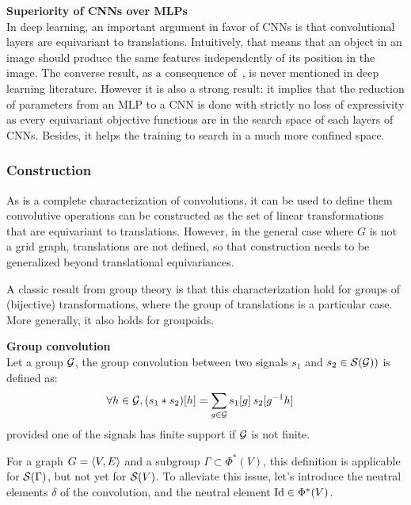 \begin{remark}\textbf{Superiority of CNNs over MLPs}\\
In deep learning, an important argument in favor of CNNs is that convolutional layers are equivariant to translations. Intuitively, that means that an object in an image should produce the same features independently of its position in the image. The converse result, as a consequence of~, is never mentioned in deep learning literature. However it is also a strong result: it implies that the reduction of parameters from an MLP to a CNN is done with strictly no loss of expressivity as every equivariant objective functions are in the search space of each layers of CNNs. Besides, it helps the training to search in a much more confined space.
\end{remark}

\subsubsection{Construction}

As  is a complete characterization of convolutions, it can be used to define them \ie convolutive operations can be constructed as the set of linear transformations that are equivariant to translations. However, in the general case where $G$ is not a grid graph, translations are not defined, so that construction needs to be generalized beyond translational equivariances.

A classic result from group theory is that this characterization hold for groups of (bijective) transformations, where the group of translations is a particular case. More generally, it also holds for groupoids.

\begin{definition}\textbf{Group convolution}\\
Let a group $\mathcal{G}$, the group convolution between two signals $s_1$ and $s_2 \in \mathcal{S}(\mathcal{G}))$ is defined as:
\begin{align*}
\forall h \in \group, (s_1 \ast s_2)[h] & = \displaystyle \sum_{g \in \group} s_1[g] \h{2} s_2[g^{-1}h]%
\end{align*}
provided one of the signals has finite support if $\mathcal{G}$ is not finite.
\end{definition}

For a graph $G = \langle V, E \rangle$ and a subgroup $\Gamma \subset \Phi^*(V)$, this definition is applicable for $\mathcal{S}(\Gamma)$, but not yet for $\mathcal{S}(V)$. To alleviate this issue, let's introduce the neutral elements $\delta$ of the convolution, and the neutral element $\operatorname{Id} \in \Phi^*(V)$.

